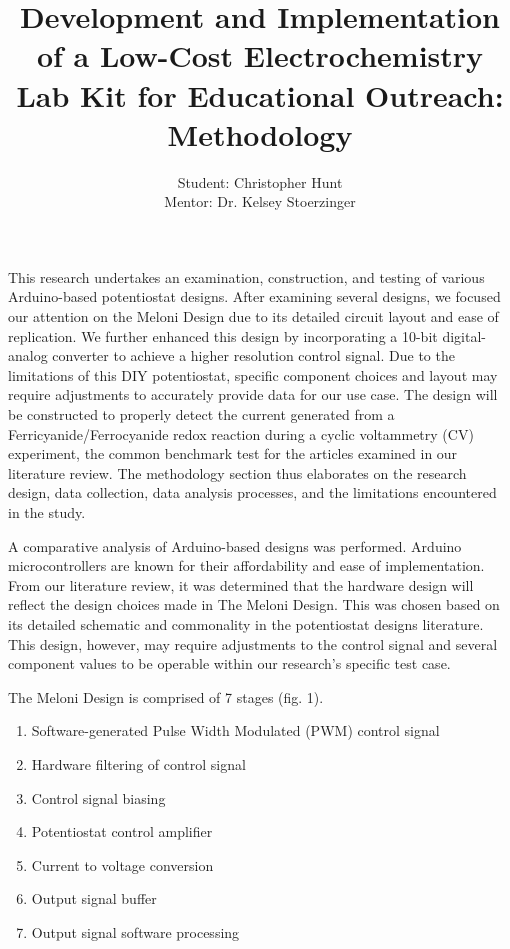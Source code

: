 \documentclass{article}
\title{\textcolor{mycolor}{\textbf{{\huge Development and Implementation of a Low-Cost Electrochemistry Lab Kit for Educational Outreach: Methodology}}}}
\author{Student: Christopher Hunt \\ Mentor: Dr. Kelsey Stoerzinger}
\date{}
\begin{document}
\pagestyle{fancy}
\fancyhf{}
\rfoot{}
\rhead{\thepage}
\maketitle
This research undertakes an examination, construction, and testing of various Arduino-based potentiostat designs. After examining several designs, we focused our attention on the Meloni Design due to its detailed circuit layout and ease of replication. We further enhanced this design by incorporating a 10-bit digital-analog converter to achieve a higher resolution control signal. Due to the limitations of this DIY potentiostat, specific component choices and layout may require adjustments to accurately provide data for our use case. The design will be constructed to properly detect the current generated from a Ferricyanide/Ferrocyanide redox reaction during a cyclic voltammetry (CV) experiment, the common benchmark test for the articles examined in our literature review. The methodology section thus elaborates on the research design, data collection, data analysis processes, and the limitations encountered in the study.

A comparative analysis of Arduino-based designs was performed. Arduino microcontrollers are known for their affordability and ease of implementation. From our literature review, it was determined that the hardware design will reflect the design choices made in The Meloni Design. This was chosen based on its detailed schematic and commonality in the potentiostat designs literature. This design, however, may require adjustments to the control signal and several component values to be operable within our research's specific test case.

The Meloni Design is comprised of 7 stages (fig. 1).
\begin{enumerate}
    \item Software-generated Pulse Width Modulated (PWM) control signal
    \item Hardware filtering of control signal
    \item Control signal biasing
    \item Potentiostat control amplifier
    \item Current to voltage conversion
    \item Output signal buffer
    \item Output signal software processing
\end{enumerate}
\end{document}
